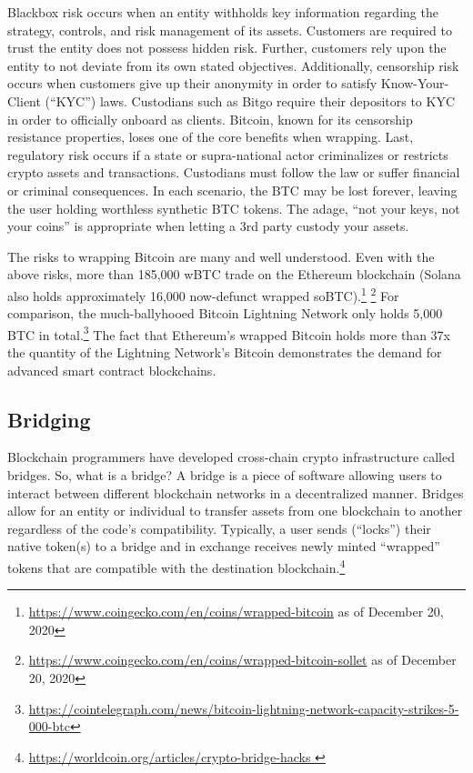 \documentclass[twoside, a4paper, 11pt]{article}
\begin{document}
  Blackbox risk occurs when an entity withholds key information regarding the strategy, controls, and risk management of its assets. Customers are required to trust the entity does not possess hidden risk. Further, customers rely upon the entity to not deviate from its own stated objectives. Additionally, censorship risk occurs when customers give up their anonymity in order to satisfy Know-Your-Client (“KYC”) laws. Custodians such as Bitgo require their depositors to KYC in order to officially onboard as clients. Bitcoin, known for its censorship resistance properties, loses one of the core benefits when wrapping. Last, regulatory risk occurs if a state or supra-national actor criminalizes or restricts crypto assets and transactions. Custodians must follow the law or suffer financial or criminal consequences. In each scenario, the BTC may be lost forever, leaving the user holding worthless synthetic BTC tokens. The adage, “not your keys, not your coins” is appropriate when letting a 3rd party custody your assets.

  The risks to wrapping Bitcoin are many and well understood. Even with the above risks, more than 185,000 wBTC trade on the Ethereum blockchain (Solana also holds approximately 16,000 now-defunct wrapped soBTC).\footnote{\url{https://www.coingecko.com/en/coins/wrapped-bitcoin} as of December 20, 2020} \footnote{\url{https://www.coingecko.com/en/coins/wrapped-bitcoin-sollet} as of December 20, 2020} For comparison, the much-ballyhooed Bitcoin Lightning Network only holds 5,000 BTC in total.\footnote{\url{https://cointelegraph.com/news/bitcoin-lightning-network-capacity-strikes-5-000-btc}} The fact that Ethereum’s wrapped Bitcoin holds more than 37x the quantity of the Lightning Network’s Bitcoin demonstrates the demand for advanced smart contract blockchains.

  \subsection{Bridging}

  Blockchain programmers have developed cross-chain crypto infrastructure called bridges. So, what is a bridge? A bridge is a piece of software allowing users to interact between different blockchain networks in a decentralized manner. Bridges allow for an entity or individual to transfer assets from one blockchain to another regardless of the code’s compatibility. Typically, a user sends (“locks”) their native token(s) to a bridge and in exchange receives newly minted “wrapped” tokens that are compatible with the destination blockchain.\footnote{\url{https://worldcoin.org/articles/crypto-bridge-hacks
  }}
\end{document}
